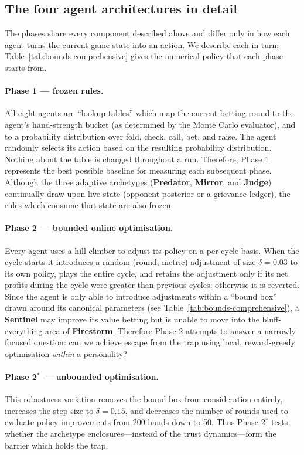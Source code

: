 \documentclass[10pt,twocolumn,letterpaper]{article}
\newcommand{\arch}[1]{\textbf{#1}}
\begin{document}
\subsection{The four agent architectures in detail}
The phases share every component described above and differ only in
how each agent turns the current game state into an action. We
describe each in turn; Table~\ref{tab:bounds-comprehensive} gives the
numerical policy that each phase starts from.

\paragraph{Phase 1 --- frozen rules.} All eight agents are ``lookup tables'' which map the current betting
round to the agent's hand-strength bucket (as determined by the Monte Carlo
evaluator), and to a probability distribution over fold, check, call, bet, and
raise. The agent randomly selects its action based on the resulting probability
distribution. Nothing about the table is changed throughout a run. Therefore,
Phase 1 represents the best possible baseline for measuring each subsequent
phase. Although the three adaptive archetypes (\arch{Predator}, \arch{Mirror},
and \arch{Judge}) continually draw upon live state (opponent posterior or a
grievance ledger), the rules which consume that state are also frozen.

\paragraph{Phase 2 --- bounded online optimisation.} Every agent uses a hill climber to adjust its policy on a per-cycle basis.
When the cycle starts it introduces a random (round, metric) adjustment of size
$\delta = 0.03$ to its own policy, plays the entire cycle, and retains the
adjustment only if its net profits during the cycle were greater than previous
cycles; otherwise it is reverted. Since the agent is only able to introduce
adjustments within a ``bound box'' drawn around its canonical parameters (see
Table~\ref{tab:bounds-comprehensive}), a \arch{Sentinel} may improve its
value betting but is unable to move into the bluff-everything area of
\arch{Firestorm}. Therefore Phase 2 attempts to answer a narrowly focused
question: can we achieve escape from the trap using local, reward-greedy
optimisation \emph{within} a personality?

\paragraph{Phase 2$^{*}$ --- unbounded optimisation.} This robustness variation removes the bound box from consideration entirely,
increases the step size to $\delta = 0.15$, and decreases the number of rounds
used to evaluate policy improvements from 200 hands down to 50. Thus
Phase 2$^{*}$ tests whether the archetype enclosures---instead of the trust
dynamics---form the barrier which holds the trap.
\end{document}
